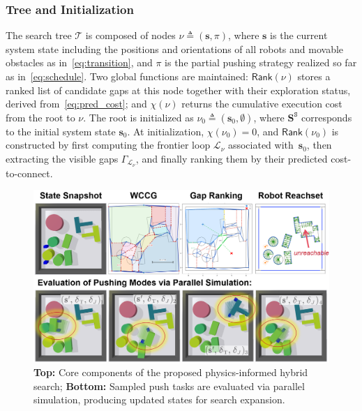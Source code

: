 \subsubsection{Tree and Initialization}
The search tree $\mathcal{T}$ is composed of nodes
$\nu\triangleq(\mathbf{s},\pi)$, where $\mathbf{s}$ is the current system
state including the positions and orientations of all robots and movable
obstacles as in~\eqref{eq:transition}, and $\pi$ is the partial pushing
strategy realized so far as in~\eqref{eq:schedule}. Two global functions are
maintained: $\mathsf{Rank}(\nu)$ stores a ranked list of candidate gaps at this
node together with their exploration status, derived from~\eqref{eq:pred_cost};
and $\chi(\nu)$ returns the cumulative execution cost
from the root to $\nu$.
The root is initialized as
$\nu_0\triangleq(\mathbf{s}_0,\emptyset)$, where
$\mathbf{S}^{\texttt{S}}$ corresponds to the initial system state
$\mathbf{s}_0$. At initialization, $\chi(\nu_0)=0$, and
$\mathsf{Rank}(\nu_0)$ is constructed by first computing the frontier loop
$\mathcal{L}_\nu$ associated with~$\mathbf{s}_0$, then extracting the visible
gaps $\Gamma_{\mathcal{L}_\nu}$, and finally ranking them by their predicted
cost-to-connect.
\begin{figure}[t!]
  \centering
  \includegraphics[width=0.95\linewidth]{figures/PIHS.png}
  \vspace{-0.15in}
  \caption{
\textbf{Top:} Core components of the proposed physics-informed hybrid search;
\textbf{Bottom:} Sampled push tasks are evaluated via parallel simulation, producing updated states
for search expansion.}
    \label{fig:PIHS}
   \vspace{-4mm}
\end{figure}
